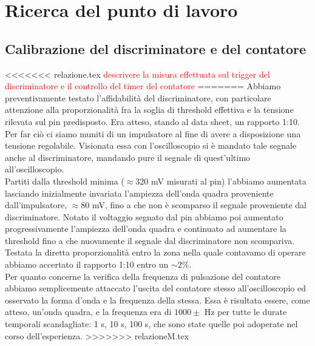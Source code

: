 \documentclass[a4paper,10pt]{article}
\newcommand{\note}[1]{\textcolor{red}{#1}}
\begin{document}
\section{Ricerca del punto di lavoro}
\label{sec:puntodilavoro} 
\subsection{Calibrazione del discriminatore e del contatore}
<<<<<<< relazione.tex
\note{descrivere la misura effettuata sul trigger del discriminatore e il controllo del timer del contatore}
=======
Abbiamo preventivamente testato l'affidabilità del discriminatore, con particolare attenzione alla proporzionalità fra la soglia di threshold effettiva e la tensione rilevata sul pin predisposto. Era atteso, stando al data sheet, un rapporto 1:10.\\
Per far ciò ci siamo muniti di un impulsatore al fine di avere a disposizione una tensione regolabile. Visionata essa con l'oscilloscopio si è mandato tale segnale anche al discriminatore, mandando pure il segnale di quest'ultimo all'oscilloscopio.\\
Partiti dalla threshold minima ($\approx320$ mV misurati al pin) l'abbiamo aumentata lasciando inizialmente invariata l'ampiezza dell'onda quadra proveniente dall'impulsatore, $\approx80$ mV, fino a che non è scomparso il segnale proveniente dal discriminatore. Notato il voltaggio segnato dal pin abbiamo poi aumentato progressivamente l'ampiezza dell'onda quadra e continuato ad aumentare la threshold fino a che nuovamente il segnale dal discriminatore non scompariva. Testata la diretta proporzionalità entro la zona nella quale contavamo di operare abbiamo accertato il rapporto 1:10 entro un $\sim2\%$.
\\Per quanto concerne la verifica della frequenza di pulsazione del contatore abbiamo semplicemente attaccato l'uscita del contatore stesso all'oscilloscopio ed osservato la forma d'onda e la frequenza della stessa. Essa è risultata essere, come atteso, un'onda quadra, e la frequenza era di $1000\pm$ Hz per tutte le durate temporali scandagliate: 1 s, 10 s, 100 s, che sono state quelle poi adoperate nel corso dell'esperienza.
>>>>>>> relazioneM.tex
\end{document}
